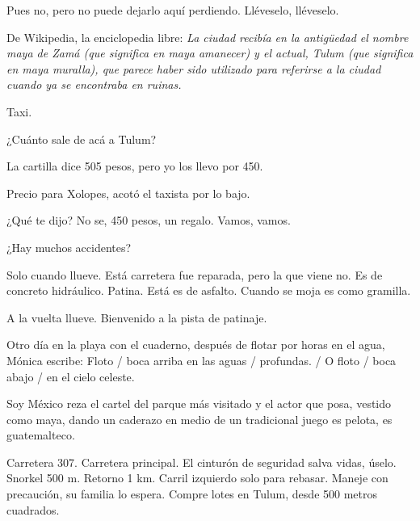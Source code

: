 \documentclass[11pt,twoside,openright,a6paper]{book}
\begin{document}
Pues no, pero no puede dejarlo aquí perdiendo. Lléveselo, lléveselo.

\vspace{0.5cm}

De Wikipedia, la enciclopedia libre: \emph{La ciudad recibía en la antigüedad el nombre maya de Zamá (que significa en maya amanecer) y el actual, Tulum (que significa en maya muralla), que parece haber sido utilizado para referirse a la ciudad cuando ya se encontraba en ruinas.}

\vspace{0.5cm}

Taxi.

¿Cuánto sale de acá a Tulum?

La cartilla dice 505 pesos, pero yo los llevo por 450. 

Precio para Xolopes, acotó el taxista por lo bajo.

¿Qué te dijo? No se, 450 pesos, un regalo. Vamos, vamos.

\vspace{0.5cm}

¿Hay muchos accidentes?

Solo cuando llueve. Está carretera fue reparada, pero la que viene no. Es de concreto hidráulico. Patina. Está es de asfalto. Cuando se moja es como gramilla.

\vspace{0.5cm}

A la vuelta llueve. Bienvenido a la pista de patinaje.

\vspace{0.5cm}

Otro día en la playa con el cuaderno, después de flotar por horas en el agua, Mónica escribe: Floto / boca arriba en las aguas / profundas. / O floto / boca abajo / en el cielo celeste.

\vspace{0.5cm}

Soy México reza el cartel del parque más visitado y el actor que posa, vestido como maya, dando un caderazo en medio de un tradicional juego es pelota, es guatemalteco.

\vspace{0.5cm}

Carretera 307. Carretera principal. El cinturón de seguridad salva vidas, úselo. Snorkel 500  m. Retorno 1 km. Carril izquierdo solo para rebasar. Maneje con precaución, su familia lo espera. Compre lotes en Tulum, desde 500 metros cuadrados.

\vspace{0.5cm}
\end{document}

